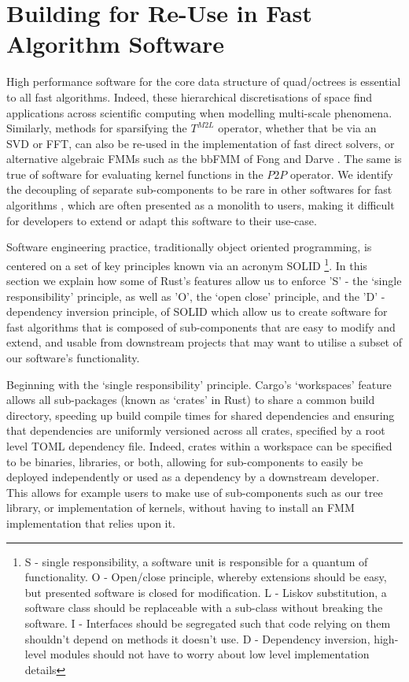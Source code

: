 \section{Building for Re-Use in Fast Algorithm Software}\label{chpt:2:sec:3}

High performance software for the core data structure of quad/octrees is essential to all fast algorithms. Indeed, these hierarchical discretisations of space find applications across scientific computing when modelling multi-scale phenomena. Similarly, methods for sparsifying the $T^{M2L}$ operator, whether that be via an SVD or FFT, can also be re-used in the implementation of fast direct solvers, or alternative algebraic FMMs such as the bbFMM of Fong and Darve \cite{fong2009black}. The same is true of software for evaluating kernel functions in the $P2P$ operator. We identify the decoupling of separate sub-components to be rare in other softwares for fast algorithms \cite{malhotra2015pvfmm,wang2021exafmm,h2lib2016github}, which are often presented as a monolith to users, making it difficult for developers to extend or adapt this software to their use-case.

Software engineering practice, traditionally object oriented programming, is centered on a set of key principles known via an acronym SOLID \footnote{S - single responsibility, a software unit is responsible for a quantum of functionality. O - Open/close principle, whereby extensions should be easy, but presented software is closed for modification. L - Liskov substitution, a software class should be replaceable with a sub-class without breaking the software. I - Interfaces should be segregated such that code relying on them shouldn't depend on methods it doesn't use. D - Dependency inversion, high-level modules should not have to worry about low level implementation details}. In this section we explain how some of Rust's features allow us to enforce 'S' - the `single responsibility' principle, as well as 'O', the `open close' principle, and the 'D' - dependency inversion principle, of SOLID which allow us to create software for fast algorithms that is composed of sub-components that are easy to modify and extend, and usable from downstream projects that may want to utilise a subset of our software's functionality.

Beginning with the `single responsibility' principle. Cargo's `workspaces' feature allows all sub-packages (known as `crates' in Rust) to share a common build directory, speeding up build compile times for shared dependencies and ensuring that dependencies are uniformly versioned across all crates, specified by a root level TOML dependency file. Indeed, crates within a workspace can be specified to be binaries, libraries, or both, allowing for sub-components to easily be deployed independently or used as a dependency by a downstream developer. This allows for example users to make use of sub-components such as our tree library, or implementation of kernels, without having to install an FMM implementation that relies upon it.

